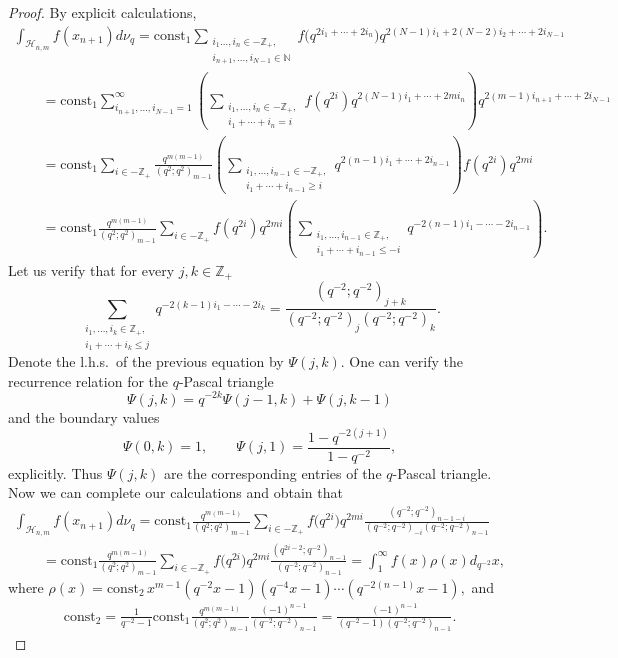 \documentclass[11pt]{article}
\begin{document}
\begin{proof} By explicit calculations,
\begin{gather*}
\int_{\mathscr{H}_{n,m}} f(x_{n+1}) d\nu_q= \mathrm{const_1}
\sum_{\substack{i_1\ldots,i_n \in -\mathbb{Z}_+,\\
i_{n+1},\ldots,i_{N-1} \in \mathbb{N}}} f\big(q^{2i_1+\cdots+2i_n}\big)
q^{2(N-1)i_1+2(N-2)i_2+\cdots+2i_{N-1}}
\\
\qquad{} = \mathrm{const_1}    \sum \limits_{i_{n+1},\ldots,i_{N-1}=1}^\infty \left(\sum_{\substack{i_1, \ldots, i_n
\in -\mathbb Z_+, \\ i_1+\cdots+i_n=i}} f(q^{2i})
q^{2(N-1)i_1+\cdots+2mi_n}\right) q^{2(m-1)i_{n+1}+\cdots+2i_{N-1}}
\\
\qquad{}= \mathrm{const_1} \sum_{i \in -\mathbb Z_+} \frac{q^{m(m-1)}}{(q^2;q^2)_{m-1}} \left(\sum_{\substack{i_1, \ldots, i_{n-1}
\in -\mathbb Z_+, \\ i_1+\cdots+i_{n-1} \geq i}}
q^{2(n-1)i_1+\cdots+2i_{n-1}}\right)f(q^{2i})q^{2mi}
\\
\qquad{}= \mathrm{const_1} \frac{q^{m(m-1)}}{(q^2;q^2)_{m-1}} \sum_{i \in -\mathbb Z_+} f(q^{2i})q^{2mi}  \left(
\sum_{\substack{i_1, \ldots, i_{n-1} \in \mathbb Z_+, \\ i_1+\cdots+i_{n-1} \leq -i}}
q^{-2(n-1)i_1-\cdots-2i_{n-1}}\right).
\end{gather*}
Let us verify that for every $j,k \in \mathbb Z_+$
\[
\sum_{\substack{i_1, \ldots, i_k \in \mathbb Z_+, \\ i_1+\cdots+i_k
\leq j}}
q^{-2(k-1)i_1-\cdots-2i_k}=\frac{(q^{-2};q^{-2})_{j+k}}{(q^{-2};q^{-2})_j(q^{-2};q^{-2})_k}.
\]
Denote the l.h.s.\ of the previous equation by $\Psi(j,k)$. One can verify the recurrence relation for the
$q$-Pascal triangle
\[
\Psi(j,k)=q^{-2k}\Psi(j-1,k)+\Psi(j,k-1)
\]
and the boundary values
\[
\Psi(0,k)=1, \qquad \Psi(j,1)=\frac{1-q^{-2(j+1)}}{1-q^{-2}},
\]
explicitly. Thus $\Psi(j,k)$ are the corresponding entries of the $q$-Pascal triangle. Now we can complete our
calculations and obtain that
\begin{gather*}
\int_{\mathscr{H}_{n,m}} f(x_{n+1}) d\nu_q= \mathrm{const_1}
\frac{q^{m(m-1)}}{(q^2;q^2)_{m-1}} \sum_{i \in -\mathbb Z_+} f\big(q^{2i}\big)
q^{2mi}
\frac{(q^{-2};q^{-2})_{n-1-i}}{(q^{-2};q^{-2})_{-i}(q^{-2};q^{-2})_{n-1}}
\\
\qquad {} = \mathrm{const_1}   \frac{q^{m(m-1)}}{(q^2;q^2)_{m-1}} \sum_{i
\in -\mathbb Z_+} f\big(q^{2i}\big) q^{2mi}
\frac{(q^{2i-2};q^{-2})_{n-1}}{(q^{-2};q^{-2})_{n-1}}=\int_1^\infty
f(x)\rho(x) d_{q^{-2}}x,
\end{gather*}
where $\rho(x)=\mathrm{const_2} \,  x^{m-1}(q^{-2}x-1)(q^{-4}x-1)\cdots (q^{-2(n-1)}x-1),$ and
\begin{gather*}
\mathrm{const_2}=\frac{1}{q^{-2}-1} \mathrm{const_1}   \frac{q^{m(m-1)}}{(q^2;q^2)_{m-1}}
\frac{(-1)^{n-1}}{(q^{-2};q^{-2})_{n-1}} =
\frac{(-1)^{n-1}}{(q^{-2}-1)(q^{-2};q^{-2})_{n-1}}.  \tag*{\qed}
\end{gather*}
\renewcommand{\qed}{}
\end{proof}
\end{document}
